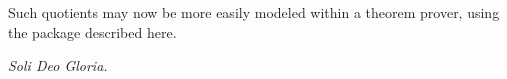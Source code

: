 \documentclass[envcountsame,runningheads]{llncs}
\begin{document}
Such quotients may now be more easily modeled within a theorem prover,
using the package described here.

{\it Soli Deo Gloria.}


%
%
%
%
%
%
\end{document}
